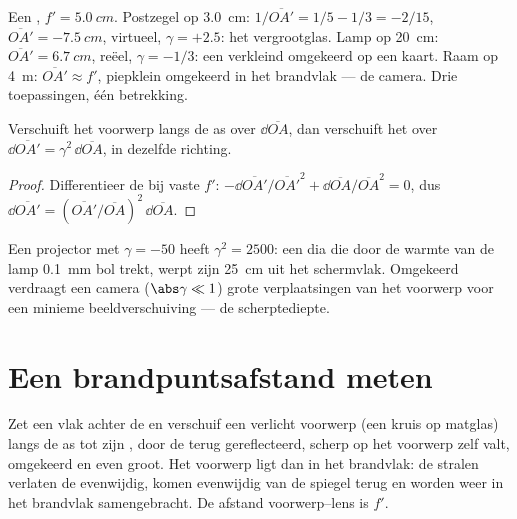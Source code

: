 \begin{example}\label{ex:b1:mirrors-thin-lenses:lensuses}
Een , $f' = \qty{5.0}{cm}$. Postzegel op \qty{3.0}{cm}:
$1/\overline{OA'} = 1/5 - 1/3 = -2/15$, $\overline{OA'} = \qty{-7.5}{cm}$,
virtueel, $\gamma = +2.5$: het vergrootglas. Lamp op \qty{20}{cm}:
$\overline{OA'} = \qty{6.7}{cm}$, reëel, $\gamma = -1/3$: een verkleind
omgekeerd  op een kaart. Raam op \qty{4}{m}: $\overline{OA'}
\approx f'$, piepklein omgekeerd  in het brandvlak --- de camera.
Drie toepassingen, één betrekking.
\end{example}

\begin{proposition}\label{prop:b1:mirrors-thin-lenses:longitudinal}
Verschuift het voorwerp langs de as over $\dd\overline{OA}$, dan verschuift
het  over $\dd\overline{OA'} = \gamma^2\,\dd\overline{OA}$, in dezelfde
richting.
\end{proposition}

\begin{proof}
Differentieer de  bij vaste $f'$:
$-\dd\overline{OA'}/\overline{OA'}^2 + \dd\overline{OA}/\overline{OA}^2 = 0$,
dus $\dd\overline{OA'} = (\overline{OA'}/\overline{OA})^2\,\dd\overline{OA}$.
\end{proof}

\begin{remark}[Scherpstellingsdiepte]\label{rem:b1:mirrors-thin-lenses:depth}
Een projector met $\gamma = -50$ heeft $\gamma^2 = 2500$: een dia die door de
warmte van de lamp \qty{0.1}{mm} bol trekt, werpt zijn 
\qty{25}{cm} uit het schermvlak. Omgekeerd verdraagt een camera ($\abs\gamma
\ll 1$) grote verplaatsingen van het voorwerp voor een minieme
beeldverschuiving --- de scherptediepte.
\end{remark}

\section{Een brandpuntsafstand meten}

\begin{method}[Autocollimatie]\label{met:b1:mirrors-thin-lenses:autocollimation}
Zet een  vlak achter de  en verschuif een verlicht voorwerp
(een kruis op matglas) langs de as tot zijn , door de  terug
gereflecteerd, scherp op het voorwerp zelf valt, omgekeerd en even groot. Het
voorwerp ligt dan in het brandvlak: de stralen verlaten de  evenwijdig,
komen evenwijdig van de spiegel terug en worden weer in het brandvlak
samengebracht. De afstand voorwerp--lens is $f'$.
\end{method}

